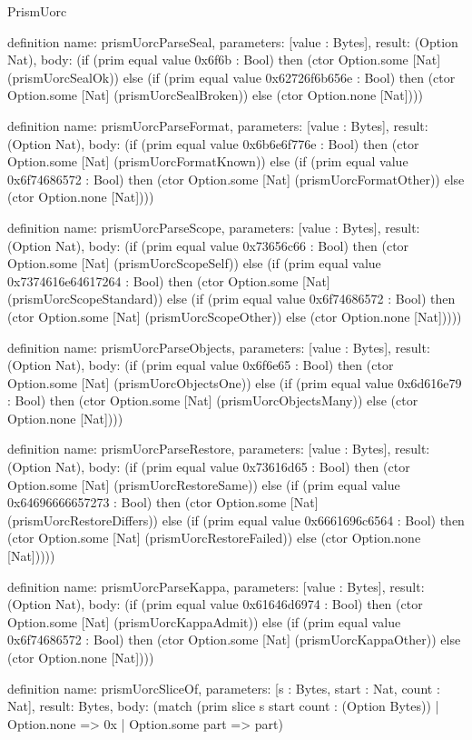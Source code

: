 \begin{lexlean}{PrismUorc}
\begin{semanticmodule}
definition{
  name: prismUorcParseSeal,
  parameters: [value : Bytes],
  result: (Option Nat),
  body: (if (prim equal value 0x6f6b : Bool) then (ctor Option.some [Nat] (prismUorcSealOk)) else (if (prim equal value 0x62726f6b656e : Bool) then (ctor Option.some [Nat] (prismUorcSealBroken)) else (ctor Option.none [Nat])))
}

definition{
  name: prismUorcParseFormat,
  parameters: [value : Bytes],
  result: (Option Nat),
  body: (if (prim equal value 0x6b6e6f776e : Bool) then (ctor Option.some [Nat] (prismUorcFormatKnown)) else (if (prim equal value 0x6f74686572 : Bool) then (ctor Option.some [Nat] (prismUorcFormatOther)) else (ctor Option.none [Nat])))
}

definition{
  name: prismUorcParseScope,
  parameters: [value : Bytes],
  result: (Option Nat),
  body: (if (prim equal value 0x73656c66 : Bool) then (ctor Option.some [Nat] (prismUorcScopeSelf)) else (if (prim equal value 0x7374616e64617264 : Bool) then (ctor Option.some [Nat] (prismUorcScopeStandard)) else (if (prim equal value 0x6f74686572 : Bool) then (ctor Option.some [Nat] (prismUorcScopeOther)) else (ctor Option.none [Nat]))))
}

definition{
  name: prismUorcParseObjects,
  parameters: [value : Bytes],
  result: (Option Nat),
  body: (if (prim equal value 0x6f6e65 : Bool) then (ctor Option.some [Nat] (prismUorcObjectsOne)) else (if (prim equal value 0x6d616e79 : Bool) then (ctor Option.some [Nat] (prismUorcObjectsMany)) else (ctor Option.none [Nat])))
}

definition{
  name: prismUorcParseRestore,
  parameters: [value : Bytes],
  result: (Option Nat),
  body: (if (prim equal value 0x73616d65 : Bool) then (ctor Option.some [Nat] (prismUorcRestoreSame)) else (if (prim equal value 0x64696666657273 : Bool) then (ctor Option.some [Nat] (prismUorcRestoreDiffers)) else (if (prim equal value 0x6661696c6564 : Bool) then (ctor Option.some [Nat] (prismUorcRestoreFailed)) else (ctor Option.none [Nat]))))
}

definition{
  name: prismUorcParseKappa,
  parameters: [value : Bytes],
  result: (Option Nat),
  body: (if (prim equal value 0x61646d6974 : Bool) then (ctor Option.some [Nat] (prismUorcKappaAdmit)) else (if (prim equal value 0x6f74686572 : Bool) then (ctor Option.some [Nat] (prismUorcKappaOther)) else (ctor Option.none [Nat])))
}

definition{
  name: prismUorcSliceOf,
  parameters: [s : Bytes, start : Nat, count : Nat],
  result: Bytes,
  body: (match (prim slice s start count : (Option Bytes))
    | Option.none => 0x
    | Option.some part => part)
}


\end{semanticmodule}
\end{lexlean}
